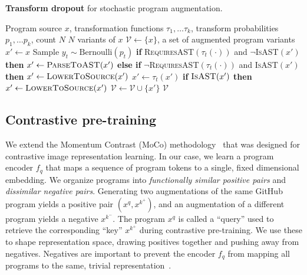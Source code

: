 \documentclass[11pt]{article}
\begin{document}
\begin{algorithm}[t]
\small
   \caption{\textbf{Transform dropout} for stochastic program augmentation.}
   \label{alg:transformation}
\begin{algorithmic}[1]
    Program source $x$, transformation functions $\tau_1,\ldots\tau_k$, transform probabilities $p_1,\ldots p_k$, count $N$
    $N$ variants of $x$
   \STATE $\mathcal{V} \leftarrow \{x\}$, a set of augmented program variants
        \STATE $x' \leftarrow x$
   		    \STATE Sample $y_t \sim \text{Bernoulli}(p_t)$
       		    \STATE \textbf{if} \textsc{RequiresAST}$(\tau_t(\cdot))$ and $\neg$\textsc{IsAST}$(x')$ \textbf{then} $x' \leftarrow \textsc{ParseToAST}(x')$
       		    \STATE \textbf{else if} $\neg$\textsc{RequiresAST}$(\tau_t(\cdot))$ and \textsc{IsAST}$(x')$ \textbf{then} $x' \leftarrow \textsc{LowerToSource}(x')$
\STATE $x' \leftarrow \tau_t(x')$
    	    \ENDIF{}
   		\ENDFOR{}
   		\STATE \textbf{if} $\textsc{IsAST}(x')$ \textbf{then} $x' \leftarrow \textsc{LowerToSource}(x')$
   		\STATE $\mathcal{V} \leftarrow \mathcal{V} \cup \{x'\}$
   \ENDFOR{}
    $\mathcal{V}$
\end{algorithmic}
\end{algorithm} 

\subsection{Contrastive pre-training} \label{infonce_loss}
We extend the Momentum Contrast (MoCo) methodology~\citep{he2019momentum} that was designed for contrastive image representation learning. In our case, we learn a program encoder $f_q$ that maps a sequence of program tokens to a single, fixed dimensional embedding.
We organize programs into \textit{functionally similar positive pairs} and \textit{dissimilar negative pairs}.
Generating two augmentations of the same GitHub program yields a positive pair $(x^q, x^{k^+})$, and an augmentation of a different program yields a negative $x^{k^-}$. The program $x^q$ is called a ``query'' used to retrieve the corresponding ``key'' $x^{k^+}$ during contrastive pre-training.
We use these to shape representation space, drawing positives together and pushing away from negatives. Negatives are important to prevent the encoder $f_q$ from mapping all programs to the same, trivial representation~\cite{pmlr-v97-saunshi19a}.
\end{document}
